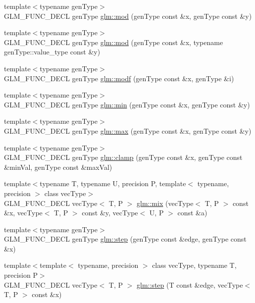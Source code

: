 \begin{CompactItemize}
\item 
{\footnotesize template$<$typename genType$>$ }\\GLM\_\-FUNC\_\-DECL genType \hyperlink{group__core__func__common_gffb813e4651fc91dbb906e46bff8ea8a}{glm::mod} (genType const \&x, genType const \&y)
\item 
{\footnotesize template$<$typename genType$>$ }\\GLM\_\-FUNC\_\-DECL genType \hyperlink{group__core__func__common_ge03755d98416b59e5d791665c6b6895a}{glm::mod} (genType const \&x, typename genType::value\_\-type const \&y)
\item 
{\footnotesize template$<$typename genType$>$ }\\GLM\_\-FUNC\_\-DECL genType \hyperlink{group__core__func__common_gcc8db4cd1d86780898c8b12e465eecf4}{glm::modf} (genType const \&x, genType \&i)
\item 
{\footnotesize template$<$typename genType$>$ }\\GLM\_\-FUNC\_\-DECL genType \hyperlink{group__core__func__common_g7c4425eacc9498bb2ab8a7cfd662cd69}{glm::min} (genType const \&x, genType const \&y)
\item 
{\footnotesize template$<$typename genType$>$ }\\GLM\_\-FUNC\_\-DECL genType \hyperlink{group__core__func__common_g4e4d7b280fec55e5dfeb1367a1a2597d}{glm::max} (genType const \&x, genType const \&y)
\item 
{\footnotesize template$<$typename genType$>$ }\\GLM\_\-FUNC\_\-DECL genType \hyperlink{group__core__func__common_g8b4808983e20c4c74b20e0a025787ab4}{glm::clamp} (genType const \&x, genType const \&minVal, genType const \&maxVal)
\item 
{\footnotesize template$<$typename T, typename U, precision P, template$<$ typename, precision $>$ class vecType$>$ }\\GLM\_\-FUNC\_\-DECL vecType$<$ T, P $>$ \hyperlink{group__core__func__common_gc208863c09fe827a44c976cc6d2aee33}{glm::mix} (vecType$<$ T, P $>$ const \&x, vecType$<$ T, P $>$ const \&y, vecType$<$ U, P $>$ const \&a)
\item 
{\footnotesize template$<$typename genType$>$ }\\GLM\_\-FUNC\_\-DECL genType \hyperlink{group__core__func__common_gcc889b24788725c04a80e29f6cc62c1e}{glm::step} (genType const \&edge, genType const \&x)
\item 
{\footnotesize template$<$template$<$ typename, precision $>$ class vecType, typename T, precision P$>$ }\\GLM\_\-FUNC\_\-DECL vecType$<$ T, P $>$ \hyperlink{group__core__func__common_gdb27417a05ff516eda338a7047cea913}{glm::step} (T const \&edge, vecType$<$ T, P $>$ const \&x)

\end{CompactItemize}

